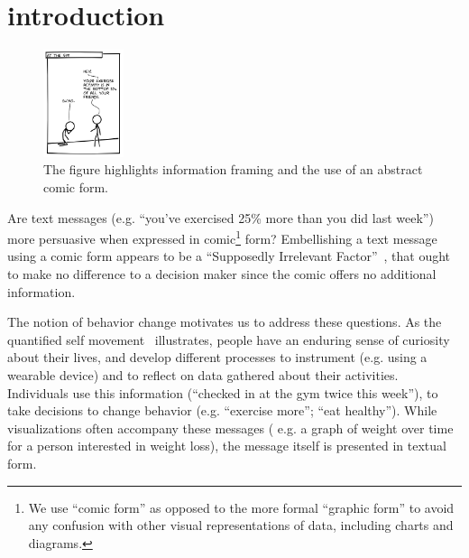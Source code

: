 



\section{introduction}
\label{sec:introduction}

\begin{figure}
    \centering
    \includegraphics[width=0.21\textwidth]{figures/intro_new.png}
  \vspace{-10pt}
  \caption{The figure highlights information framing and the use of an abstract comic form.} \label{fig:intro}
  \vspace{-10pt}
\end{figure}

Are text messages (e.g. ``you've exercised 25\% more than you did last week'') more persuasive when expressed in comic\footnote{We use ``comic form'' as opposed to the more formal ``graphic form'' to avoid any confusion with other visual representations of data, including charts and diagrams.} form? Embellishing a text message using a comic form appears to be a ``Supposedly Irrelevant Factor''~\cite{Thaler2015}, that ought to make no difference to a decision maker since the comic offers no additional information.

The notion of behavior change motivates us to address these questions. As the quantified self movement~\cite{Epstein2014,Choe2014} illustrates, people have an enduring sense of curiosity about their lives, and develop different processes to instrument (e.g. using a wearable device) and to reflect on data gathered about their activities. Individuals use this information (``checked in at the gym twice this week''), to take decisions to change behavior (e.g. ``exercise more''; ``eat healthy''). 
 While visualizations often accompany these messages ( e.g. a graph of weight over time for a person interested in weight loss), the message itself is presented in textual form.

